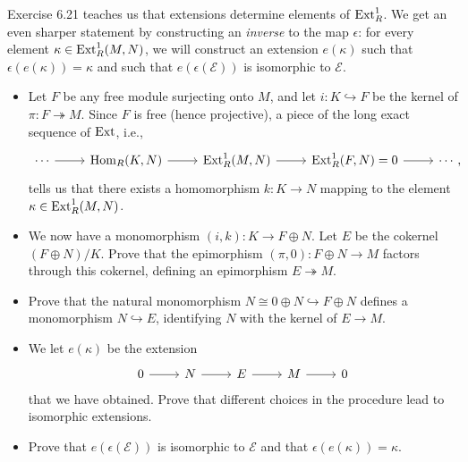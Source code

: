 \documentclass[../../master.tex]{subfiles}
\begin{document}
\begin{problem}
    Exercise 6.21 teaches us that extensions determine elements of $\operatorname{Ext}_R^{1}$.
    We get an even sharper statement by constructing an \textit{inverse} to the map $\epsilon$:
    for every element $\kappa \in \operatorname{Ext}_R^{1}(M, N)$, we will construct an extension $e(\kappa)$ such that $\epsilon(e(\kappa)) = \kappa$ and such that $e(\epsilon(\mathscr{E}))$ is isomorphic to $\mathscr{E}$.
    \begin{itemize}[leftmargin=*] 
        \item Let $F$ be any free module surjecting onto $M$, and let $i : K \hookrightarrow F$ be the kernel of $\pi : F \twoheadrightarrow M$. 
            Since $F$ is free (hence projective), a piece of the long exact sequence of $\operatorname{Ext}$, i.e.,
            \[
            \begin{tikzcd}
                \cdots & \Hom_R(K, N) & \Ext_R^{1}(M, N) & \Ext_R^{1}(F, N) = 0 & \cdots,
        \arrow[from=1-1, to=1-2]
        \arrow[from=1-2, to=1-3]
        \arrow[from=1-3, to=1-4]
        \arrow[from=1-4, to=1-5] 
            \end{tikzcd}
            \]
            tells us that there exists a homomorphism $k : K \to N$ mapping to the element $\kappa \in \operatorname{Ext}_R^{1}(M, N)$.
        \item We now have a monomorphism $(i, k) : K \to F \oplus N$.
            Let $E$ be the cokernel $(F \oplus N)/K$.
            Prove that the epimorphism $(\pi, 0) : F \oplus N \to M$ factors through this cokernel, defining an epimorphism $E \twoheadrightarrow M$.
        \item Prove that the natural monomorphism $N \cong 0 \oplus N \hookrightarrow F \oplus N$ defines a monomorphism $N \hookrightarrow E$, identifying $N$ with the kernel of $E \to M$.
        \item We let $e(\kappa)$ be the extension
            \[
            \begin{tikzcd}
                0 & N & E & M & 0
                \arrow[from=1-1, to=1-2]
                \arrow[from=1-2, to=1-3]
                \arrow[from=1-3, to=1-4]
                \arrow[from=1-4, to=1-5] 
            \end{tikzcd}
            \]
            that we have obtained.
            Prove that different choices in the procedure lead to isomorphic extensions.
        \item Prove that $e(\epsilon(\mathscr{E}))$ is isomorphic to $\mathscr{E}$ and that $\epsilon(e(\kappa)) = \kappa$.

\end{itemize}
\end{problem}
\end{document}
